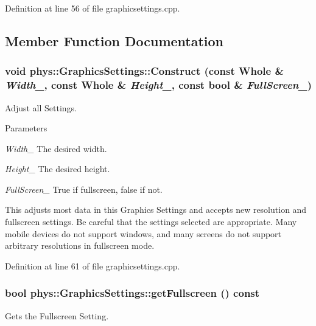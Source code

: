 Definition at line 56 of file graphicsettings.cpp.



\subsection{Member Function Documentation}
\hypertarget{classphys_1_1GraphicsSettings_a63d41a500ee1ddf0ea9ffba5e353bae0}{
\subsubsection[{Construct}]{\setlength{\rightskip}{0pt plus 5cm}void phys::GraphicsSettings::Construct (const Whole \& {\em Width\_\-}, \/  const Whole \& {\em Height\_\-}, \/  const bool \& {\em FullScreen\_\-})}}
\label{dc/df1/classphys_1_1GraphicsSettings_a63d41a500ee1ddf0ea9ffba5e353bae0}


Adjust all Settings. 


\begin{DoxyParams}{Parameters}
\item[{\em Width\_\-}]The desired width. \item[{\em Height\_\-}]The desired height. \item[{\em FullScreen\_\-}]True if fullscreen, false if not.\end{DoxyParams}
This adjusts most data in this Graphics Settings and accepts new resolution and fullscreen settings. Be careful that the settings selected are appropriate. Many mobile devices do not support windows, and many screens do not support arbitrary resolutions in fullscreen mode. 

Definition at line 61 of file graphicsettings.cpp.

\hypertarget{classphys_1_1GraphicsSettings_a8871ea7d5c65c3b59d1d34b59531743f}{
\subsubsection[{getFullscreen}]{\setlength{\rightskip}{0pt plus 5cm}bool phys::GraphicsSettings::getFullscreen () const}}
\label{dc/df1/classphys_1_1GraphicsSettings_a8871ea7d5c65c3b59d1d34b59531743f}


Gets the Fullscreen Setting. 

